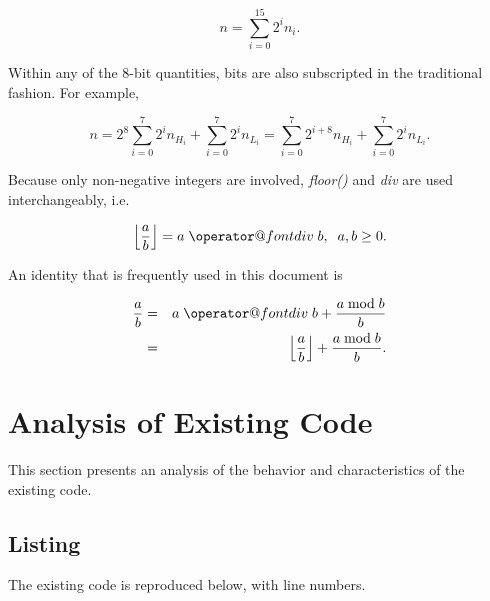 \documentclass[letterpaper,10pt,titlepage]{article}
\makeatletter
\def\bdiv{%
  \nonscript\mskip-\medmuskip\mkern5mu%
  \mathbin{\operator@font div}\penalty900\mkern5mu%
  \nonscript\mskip-\medmuskip}
\makeatother
\begin{document}
\begin{equation}
\label{eq:snom0:02}
n = \sum_{i=0}^{15} 2^i n_i .
\end{equation}

Within any of the 8-bit quantities, bits are also subscripted in the traditional fashion.
For example,

\begin{equation}
\label{eq:snom0:03}
n = 2^8 \sum_{i=0}^{7} 2^i n_{H_i} + \sum_{i=0}^{7} 2^i n_{L_i} 
  =     \sum_{i=0}^{7} 2^{i+8} n_{H_i} + \sum_{i=0}^{7} 2^i n_{L_i} .
\end{equation}

Because only non-negative integers are involved, \emph{floor()} and 
\emph{div} are used interchangeably, i.e.

\begin{equation}
\label{eq:snom0:04}
\left\lfloor \frac{a}{b} \right\rfloor = a \bdiv b, \;\; a,b \geq 0 .
\end{equation}

An identity that is frequently used in this document is

\begin{eqnarray}
\label{eq:snom0:05}
\frac{a}{b} & = & a \bdiv b + \frac{a \bmod b}{b} \\
\label{eq:snom0:06}
            & = & \left\lfloor \frac{a}{b} \right\rfloor + \frac{a \bmod b}{b} .
\end{eqnarray}



\section{Analysis of Existing Code}
\label{saec0}
 
This section presents an analysis of the behavior and characteristics of
the existing code.

 

\subsection{Listing}
\label{saec0:slec0}

The existing code is reproduced below, with line numbers.
 
\end{document}
